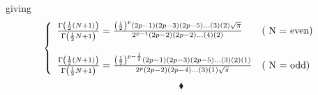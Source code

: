 giving 
\begin{align}
\left\{\begin{array}{ll}
\frac{\Gamma\left(\frac{1}{2} (N+1)\right)}{\Gamma \left(\frac{1}{2} N+1\right)}= \frac{\left(\frac{1}{2}\right)^{p }\left(2p-1\right)\left(2p-3\right)\left(2p-5\right)\dots (3)(2)\sqrt{\pi}}{2^{p-1}\left(2p-2\right)\left(2p-2\right)\dots (4)(2)}& \text{( N = even)}\\\\
\frac{\Gamma\left(\frac{1}{2} (N+1)\right)}{\Gamma \left(\frac{1}{2} N+1\right)} = \frac{\left(\frac{1}{2}\right)^{p -\frac{1}{2}}\left(2p-1\right)\left(2p-3\right)\left(2p-5\right)\dots  (3)(2)(1)}{2^{p}\left(2p-2\right)\left(2p-4\right)\dots \left(3\right)\left( 1\right)\sqrt{\pi}}& \text{( N = odd)}\\
\end{array}\right.
\end{align}
$$\blacklozenge$$
\newpage

